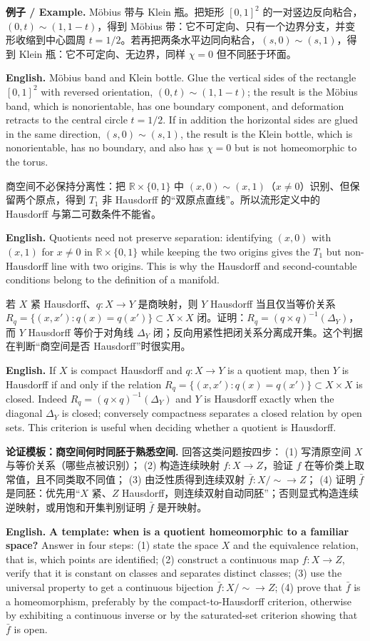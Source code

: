 \documentclass[UTF8,11pt,a4paper]{ctexart}
\newcommand{\EN}[1]{\par\noindent\textbf{English.} #1\par}
\newcommand{\EX}[2]{\par\noindent\textbf{例子 / Example.} #1\par\EN{#2}}
\begin{document}
\EX{M\"obius 带与 Klein 瓶。把矩形 $[0,1]^2$ 的一对竖边反向粘合，$(0,t)\sim(1,1-t)$，得到 M\"obius 带：它不可定向、只有一个边界分支，并变形收缩到中心圆周 $t=1/2$。若再把两条水平边同向粘合，$(s,0)\sim(s,1)$，得到 Klein 瓶：它不可定向、无边界，同样 $\chi=0$ 但不同胚于环面。}{M\"obius band and Klein bottle. Glue the vertical sides of the rectangle $[0,1]^2$ with reversed orientation, $(0,t)\sim(1,1-t)$; the result is the M\"obius band, which is nonorientable, has one boundary component, and deformation retracts to the central circle $t=1/2$. If in addition the horizontal sides are glued in the same direction, $(s,0)\sim(s,1)$, the result is the Klein bottle, which is nonorientable, has no boundary, and also has $\chi=0$ but is not homeomorphic to the torus.}

\noindent 商空间不必保持分离性：把 $\mathbb R\times\{0,1\}$ 中 $(x,0)\sim(x,1)$（$x\ne0$）识别、但保留两个原点，得到 $T_1$ 非 Hausdorff 的“双原点直线”。所以流形定义中的 Hausdorff 与第二可数条件不能省。
\EN{Quotients need not preserve separation: identifying $(x,0)$ with $(x,1)$ for $x\ne0$ in $\mathbb R\times\{0,1\}$ while keeping the two origins gives the $T_1$ but non-Hausdorff line with two origins. This is why the Hausdorff and second-countable conditions belong to the definition of a manifold.}

\noindent 若 $X$ 紧 Hausdorff、$q:X\to Y$ 是商映射，则 $Y$ Hausdorff 当且仅当等价关系 $R_q=\{(x,x'):q(x)=q(x')\}\subset X\times X$ 闭。证明：$R_q=(q\times q)^{-1}(\Delta_Y)$，而 $Y$ Hausdorff 等价于对角线 $\Delta_Y$ 闭；反向用紧性把闭关系分离成开集。这个判据在判断“商空间是否 Hausdorff”时很实用。
\EN{If $X$ is compact Hausdorff and $q:X\to Y$ is a quotient map, then $Y$ is Hausdorff if and only if the relation $R_q=\{(x,x'):q(x)=q(x')\}\subset X\times X$ is closed. Indeed $R_q=(q\times q)^{-1}(\Delta_Y)$ and $Y$ is Hausdorff exactly when the diagonal $\Delta_Y$ is closed; conversely compactness separates a closed relation by open sets. This criterion is useful when deciding whether a quotient is Hausdorff.}

\noindent\textbf{论证模板：商空间何时同胚于熟悉空间.} 回答这类问题按四步：
(1) 写清原空间 $X$ 与等价关系（哪些点被识别）；
(2) 构造连续映射 $f:X\to Z$，验证 $f$ 在等价类上取常值，且不同类取不同值；
(3) 由泛性质得到连续双射 $\bar f:X/{\sim}\to Z$；
(4) 证明 $\bar f$ 是同胚：优先用“$X$ 紧、$Z$ Hausdorff，则连续双射自动同胚”；否则显式构造连续逆映射，或用饱和开集判别证明 $\bar f$ 是开映射。
\EN{\textbf{A template: when is a quotient homeomorphic to a familiar space?} Answer in four steps: (1) state the space $X$ and the equivalence relation, that is, which points are identified; (2) construct a continuous map $f:X\to Z$, verify that it is constant on classes and separates distinct classes; (3) use the universal property to get a continuous bijection $\bar f:X/{\sim}\to Z$; (4) prove that $\bar f$ is a homeomorphism, preferably by the compact-to-Hausdorff criterion, otherwise by exhibiting a continuous inverse or by the saturated-set criterion showing that $\bar f$ is open.}
\end{document}
